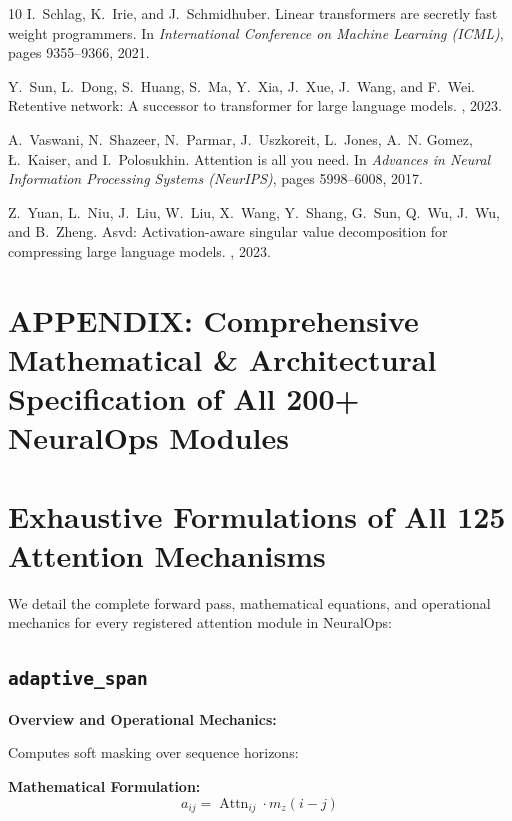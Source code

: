 \documentclass[10pt,twocolumn,letterpaper]{article}
\begin{document}
\begin{thebibliography}{10}
I.~Schlag, K.~Irie, and J.~Schmidhuber.
\newblock Linear transformers are secretly fast weight programmers.
\newblock In {\em International Conference on Machine Learning (ICML)}, pages 9355--9366, 2021.

Y.~Sun, L.~Dong, S.~Huang, S.~Ma, Y.~Xia, J.~Xue, J.~Wang, and F.~Wei.
\newblock Retentive network: A successor to transformer for large language models.
, 2023.

A.~Vaswani, N.~Shazeer, N.~Parmar, J.~Uszkoreit, L.~Jones, A.~N. Gomez, {\L}.~Kaiser, and I.~Polosukhin.
\newblock Attention is all you need.
\newblock In {\em Advances in Neural Information Processing Systems (NeurIPS)}, pages 5998--6008, 2017.

Z.~Yuan, L.~Niu, J.~Liu, W.~Liu, X.~Wang, Y.~Shang, G.~Sun, Q.~Wu, J.~Wu, and B.~Zheng.
\newblock Asvd: Activation-aware singular value decomposition for compressing large language models.
, 2023.

\end{thebibliography}

\clearpage
\appendix
\section*{APPENDIX: Comprehensive Mathematical \& Architectural Specification of All 200+ NeuralOps Modules}

\section{Exhaustive Formulations of All 125 Attention Mechanisms}
\label{app:full_attention_details}

We detail the complete forward pass, mathematical equations, and operational mechanics for every registered attention module in NeuralOps:

\subsection{\texttt{adaptive\_span}}
\textbf{Overview and Operational Mechanics:}

Computes soft masking over sequence horizons:

\textbf{Mathematical Formulation:}
\begin{equation}
a_{ij} = \operatorname{Attn}_{ij} \cdot m_z(i-j)
\end{equation}
\end{document}
